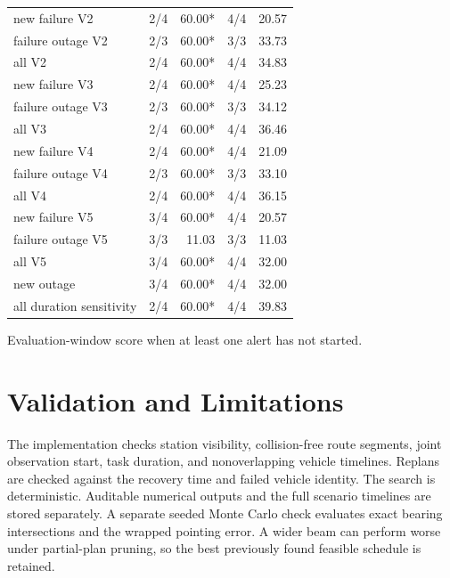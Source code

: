 \documentclass[12pt,a4paper]{article}
\begin{document}
\begin{table}[!ht]
\begin{tabular*}{0.96\linewidth}{@{\extracolsep{\fill}}lrrrr@{}}
new failure V2 & 2/4 & 60.00* & 4/4 & 20.57 \\

failure outage V2 & 2/3 & 60.00* & 3/3 & 33.73 \\

all V2 & 2/4 & 60.00* & 4/4 & 34.83 \\

new failure V3 & 2/4 & 60.00* & 4/4 & 25.23 \\

failure outage V3 & 2/3 & 60.00* & 3/3 & 34.12 \\

all V3 & 2/4 & 60.00* & 4/4 & 36.46 \\

new failure V4 & 2/4 & 60.00* & 4/4 & 21.09 \\

failure outage V4 & 2/3 & 60.00* & 3/3 & 33.10 \\

all V4 & 2/4 & 60.00* & 4/4 & 36.15 \\

new failure V5 & 3/4 & 60.00* & 4/4 & 20.57 \\

failure outage V5 & 3/3 & 11.03 & 3/3 & 11.03 \\

all V5 & 3/4 & 60.00* & 4/4 & 32.00 \\

new outage & 3/4 & 60.00* & 4/4 & 32.00 \\

all duration sensitivity & 2/4 & 60.00* & 4/4 & 39.83 \\

\bottomrule

\end{tabular*}

\par\smallskip\parbox{0.96\linewidth}{\raggedright * Evaluation-window score when at least one alert has not started.}

\end{table}

\clearpage

\section{Validation and Limitations}

The implementation checks station visibility, collision-free route segments, joint observation start, task duration, and nonoverlapping vehicle timelines. Replans are checked against the recovery time and failed vehicle identity. The search is deterministic. Auditable numerical outputs and the full scenario timelines are stored separately. A separate seeded Monte Carlo check evaluates exact bearing intersections and the wrapped pointing error. A wider beam can perform worse under partial-plan pruning, so the best previously found feasible schedule is retained.
\end{document}
